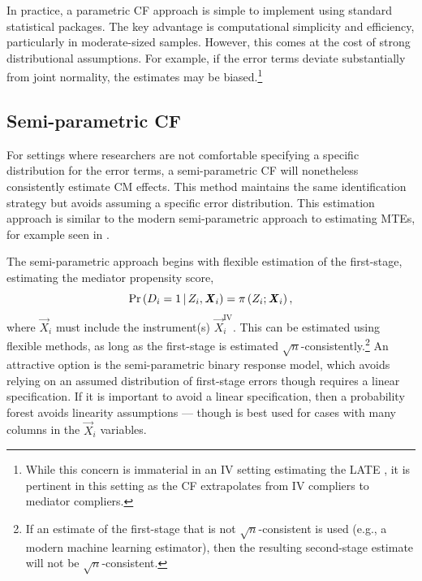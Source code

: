 In practice, a parametric CF approach is simple to implement using standard statistical packages.
The key advantage is computational simplicity and efficiency, particularly in moderate-sized samples.
However, this comes at the cost of strong distributional assumptions.
For example, if the error terms deviate substantially from joint normality, the estimates may be biased.\footnote{
    While this concern is immaterial in an IV setting estimating the LATE \citep{kline2019heckits}, it is pertinent in this setting as the CF extrapolates from IV compliers to mediator compliers.
}

\subsection{Semi-parametric CF}
For settings where researchers are not comfortable specifying a specific distribution for the error terms, a semi-parametric CF will nonetheless consistently estimate CM effects.
This method maintains the same identification strategy but avoids assuming a specific error distribution.
This estimation approach is similar to the modern semi-parametric approach to estimating MTEs, for example seen in \cite{brinch2017beyond,heckman2007econometric}.

The semi-parametric approach begins with flexible estimation of the first-stage, estimating the mediator propensity score,
\[ \Pr\left( D_i = 1 \, \middle\vert \, Z_i, \boldsymbol{\mathit{X}}_i \right)
    = \pi\left(Z_i; \boldsymbol{\mathit{X}}_i \right), \]
where $\vec X_i$ must include the instrument(s) $\vec X_i^{\text{IV}}$.
This can be estimated using flexible methods, as long as the first-stage is estimated $\sqrt{n}$-consistently.\footnote{
    If an estimate of the first-stage that is not $\sqrt{n}$-consistent is used (e.g., a modern machine learning estimator), then the resulting second-stage estimate will not be $\sqrt{n}$-consistent.
}
An attractive option is the \cite{klein1993efficient} semi-parametric binary response model, which avoids relying on an assumed distribution of first-stage errors though requires a linear specification.
If it is important to avoid a linear specification, then a probability forest avoids linearity assumptions \citep{athey2019generalized} --- though is best used for cases with many columns in the $\vec X_i$ variables.

